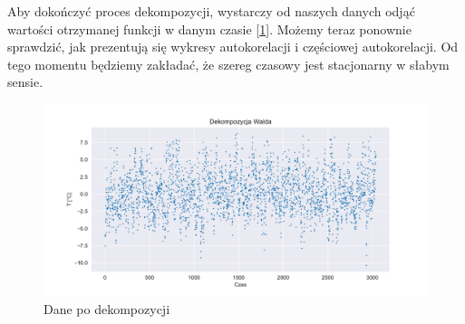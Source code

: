 \documentclass{article}
\theoremstyle{break}
\begin{document}
Aby dokończyć proces dekompozycji, wystarczy od naszych danych odjąć wartości otrzymanej funkcji w danym czasie [\ref{fig:p4}]. Możemy teraz ponownie sprawdzić, jak prezentują się wykresy autokorelacji i częściowej autokorelacji. Od tego momentu będziemy zakładać, że szereg czasowy jest stacjonarny w słabym sensie.

\begin{figure}[H]
	\begin{center}
		\includegraphics[scale=0.63]{plot4.pdf}
		\caption{Dane po dekompozycji}
		\label{fig:p4}
	\end{center}
\end{figure}
\end{document}

